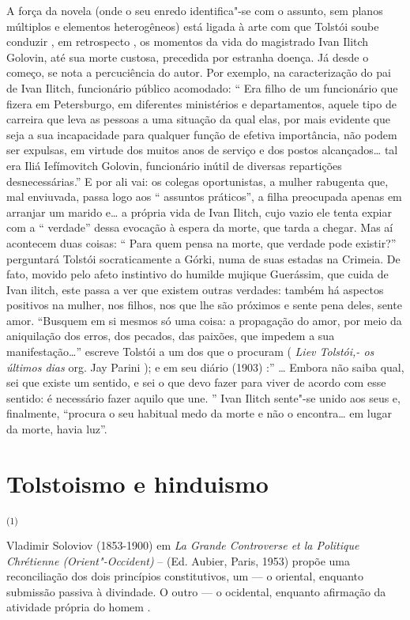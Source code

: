 A força da novela (onde o seu enredo identifica"-se com o assunto, sem
planos múltiplos e elementos heterogêneos) está ligada à arte com que
Tolstói soube conduzir , em retrospecto , os momentos da vida do
magistrado Ivan Ilitch Golovin, até sua morte custosa, precedida por
estranha doença. Já desde o começo, se nota a percuciência do autor. Por
exemplo, na caracterização do pai de Ivan Ilitch, funcionário público
acomodado: `` Era filho de um funcionário que fizera em Petersburgo, em
diferentes ministérios e departamentos, aquele tipo de carreira que leva
as pessoas a uma situação da qual elas, por mais evidente que seja a sua
incapacidade para qualquer função de efetiva importância, não podem ser
expulsas, em virtude dos muitos anos de serviço e dos postos
alcançados\ldots{} tal era Iliá Iefímovitch Golovin, funcionário inútil de
diversas repartições desnecessárias.'' E por ali vai: os colegas
oportunistas, a mulher rabugenta que, mal enviuvada, passa logo aos ``
assuntos práticos'', a filha preocupada apenas em arranjar um marido
e\ldots{} a própria vida de Ivan Ilitch, cujo vazio ele tenta expiar com a ``
verdade'' dessa evocação à espera da morte, que tarda a chegar. Mas aí
acontecem duas coisas: `` Para quem pensa na morte, que verdade pode
existir?'' perguntará Tolstói socraticamente a Górki, numa de suas
estadas na Crimeia. De fato, movido pelo afeto instintivo do humilde
mujique Guerássim, que cuida de Ivan ilitch, este passa a ver que
existem outras verdades: também há aspectos positivos na mulher, nos
filhos, nos que lhe são próximos e sente pena deles, sente amor.
``Busquem em si mesmos só uma coisa: a propagação do amor, por meio da
aniquilação dos erros, dos pecados, das paixões, que impedem a sua
manifestação\ldots{}'' escreve Tolstói a um dos que o procuram ( \emph{Liev
Tolstói,- os últimos dias} org. Jay Parini ); e em seu diário (1903) :''
\ldots{} Embora não saiba qual, sei que existe um sentido, e sei o que devo
fazer para viver de acordo com esse sentido: é necessário fazer aquilo
que une. '' Ivan Ilitch sente"-se unido aos seus e, finalmente, ``procura
o seu habitual medo da morte e não o encontra\ldots{} em lugar da morte,
havia luz''.

\chapter{Tolstoismo e hinduismo}

\textsuperscript{(1)}

Vladimir Soloviov (1853-1900) em \emph{La Grande Controverse et la
Politique Chrétienne (Orient"-Occident)} -- (Ed. Aubier, Paris, 1953)
propõe uma reconciliação dos dois princípios constitutivos, um --- o
oriental, enquanto submissão passiva à divindade. O outro --- o
ocidental, enquanto afirmação da atividade própria do homem .

